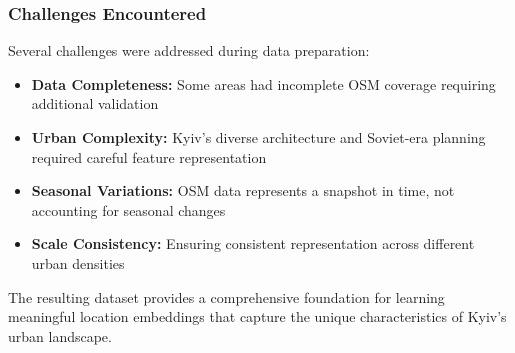 \subsubsection{Challenges Encountered}
Several challenges were addressed during data preparation:
\begin{itemize}
    \item \textbf{Data Completeness:} Some areas had incomplete OSM coverage requiring additional validation
    \item \textbf{Urban Complexity:} Kyiv's diverse architecture and Soviet-era planning required careful feature representation
    \item \textbf{Seasonal Variations:} OSM data represents a snapshot in time, not accounting for seasonal changes
    \item \textbf{Scale Consistency:} Ensuring consistent representation across different urban densities
\end{itemize}

The resulting dataset provides a comprehensive foundation for learning meaningful location embeddings that capture the unique characteristics of Kyiv's urban landscape.
